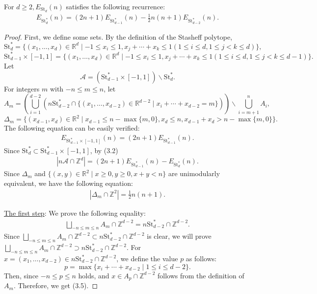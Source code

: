\documentclass[10pt,a4paper]{amsart}
\newcommand{\Ac}{\mathcal{A}}
\newcommand{\RR}{\mathbb{R}}
\newcommand{\ZZ}{\mathbb{Z}}
\begin{document}
\begin{thm}
For $d \geq 2, E_{\mathrm{St}_d}(n)$ satisfies the following recurrence:
\begin{align}
  E_{\mathrm{St}_d^\ast}(n) = (2n+1)E_{\mathrm{St}_{d-1}^\ast}(n) - \frac{1}{2}n(n+1)E_{\mathrm{St}_{d-2}^\ast}(n).
\end{align}
\end{thm}

\begin{proof}
First, we define some sets. By the definition of the Stasheff polytope,
\[
\mathrm{St}_d^\ast = \{(x_1, \ldots, x_d) \in \RR^d \mid -1 \leq x_i \leq 1, x_j + \cdots + x_k \leq 1 (1 \leq i \leq d, 1 \leq j < k \leq d)\},
\]
\[
\mathrm{St}_{d-1}^\ast \times [-1, 1] = \{(x_1, \ldots, x_d) \in \RR^d \mid -1 \leq x_i \leq 1, x_j + \cdots + x_k \leq 1 (1 \leq i \leq d, 1 \leq j < k \leq d-1)\}.
\]
Let
$$\Ac = (\mathrm{St}_{d-1}^\ast \times [-1, 1]) \backslash \mathrm{St}_d^\ast.$$
For integers $m$ with $-n \leq m \leq n$, let
\[
A_m = \left(\bigcup_{i = 1}^{d - 2}(n\mathrm{St}_{d-2}^\ast \cap \{(x_1, \ldots, x_{d-2}) \in \RR^{d-2} \mid x_i + \cdots + x_{d-2} = m\})\right) \backslash \bigcup_{i = m+1}^{n}A_i,
\]
\[
\Delta_m = \{(x_{d-1}, x_d) \in \RR^2 \mid x_{d-1} \leq n-\max\{m, 0\}, x_d \leq n, x_{d-1} + x_d > n -\max\{m, 0\}\}.
\]
The following equation can be easily verified:
\begin{align}
  E_{\mathrm{St}_{d-1}^\ast \times [-1, 1]}(n) = (2n+1)E_{\mathrm{St}_{d-1}^\ast}(n).
\end{align}
Since $\mathrm{St}_d^\ast \subset \mathrm{St}_{d-1}^\ast \times [-1, 1]$, by (3.2)
\begin{align}
  \left|n\Ac \cap \ZZ^d\right| = (2n+1)E_{\mathrm{St}_{d-1}^\ast}(n) - E_{\mathrm{St}_d^\ast}(n).
\end{align}
Since $\Delta_m$ and $\{(x,y) \in \RR^2 \mid x \geq 0, y \geq 0, x+y < n\}$ are unimodularly equivalent, we have the following equation:
\begin{align}
  |\Delta_m \cap \ZZ^2| = \frac{1}{2}n(n+1).
\end{align}

\smallskip

\noindent
\underline{The first step}: We prove the following equality:
\begin{align}
  \bigsqcup_{-n \leq m \leq n}A_m \cap \ZZ^{d-2} = n\mathrm{St}_{d-2}^\ast \cap \ZZ^{d-2}.
\end{align}
Since $\bigsqcup_{-n \leq m \leq n}A_m \cap \ZZ^{d-2} \subset n\mathrm{St}_{d-2}^\ast \cap \ZZ^{d-2}$ is clear, we will prove $\bigsqcup_{-n \leq m \leq n}A_m \cap \ZZ^{d-2} \supset n\mathrm{St}_{d-2}^\ast \cap \ZZ^{d-2}$. For $x = (x_1, \ldots, x_{d-2}) \in n\mathrm{St}_{d-2}^\ast \cap \ZZ^{d-2}$, we define the value $p$ as follows:
$$p = \max{\{x_i + \cdots + x_{d-2} \mid 1 \leq i \leq d-2\}}.$$
Then, since $-n \leq p \leq n$ holds, and $x \in A_p \cap \ZZ^{d-2}$ follows from the definition of $A_m$. Therefore, we get (3.5).


\end{proof}
\end{document}
